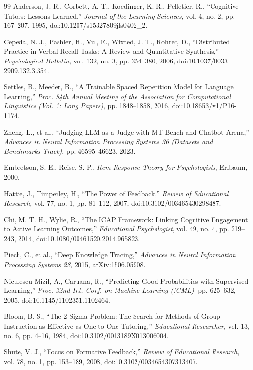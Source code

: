 \documentclass[12pt]{report}
\begin{document}
\begin{thebibliography}{99}
 Anderson, J. R., Corbett, A. T., Koedinger, K. R., Pelletier, R., ``Cognitive Tutors: Lessons Learned,'' \textit{Journal of the Learning Sciences}, vol. 4, no. 2, pp. 167--207, 1995, doi:10.1207/s15327809jls0402\_2.

 Cepeda, N. J., Pashler, H., Vul, E., Wixted, J. T., Rohrer, D., ``Distributed Practice in Verbal Recall Tasks: A Review and Quantitative Synthesis,'' \textit{Psychological Bulletin}, vol. 132, no. 3, pp. 354--380, 2006, doi:10.1037/0033-2909.132.3.354.

 Settles, B., Meeder, B., ``A Trainable Spaced Repetition Model for Language Learning,'' \textit{Proc. 54th Annual Meeting of the Association for Computational Linguistics (Vol. 1: Long Papers)}, pp. 1848--1858, 2016, doi:10.18653/v1/P16-1174.

 Zheng, L., et al., ``Judging LLM-as-a-Judge with MT-Bench and Chatbot Arena,'' \textit{Advances in Neural Information Processing Systems 36 (Datasets and Benchmarks Track)}, pp. 46595--46623, 2023.

 Embretson, S. E., Reise, S. P., \textit{Item Response Theory for Psychologists}, Erlbaum, 2000.

 Hattie, J., Timperley, H., ``The Power of Feedback,'' \textit{Review of Educational Research}, vol. 77, no. 1, pp. 81--112, 2007, doi:10.3102/003465430298487.

 Chi, M. T. H., Wylie, R., ``The ICAP Framework: Linking Cognitive Engagement to Active Learning Outcomes,'' \textit{Educational Psychologist}, vol. 49, no. 4, pp. 219--243, 2014, doi:10.1080/00461520.2014.965823.

 Piech, C., et al., ``Deep Knowledge Tracing,'' \textit{Advances in Neural Information Processing Systems 28}, 2015, arXiv:1506.05908.

 Niculescu-Mizil, A., Caruana, R., ``Predicting Good Probabilities with Supervised Learning,'' \textit{Proc. 22nd Int. Conf. on Machine Learning (ICML)}, pp. 625--632, 2005, doi:10.1145/1102351.1102464.

 Bloom, B. S., ``The 2 Sigma Problem: The Search for Methods of Group Instruction as Effective as One-to-One Tutoring,'' \textit{Educational Researcher}, vol. 13, no. 6, pp. 4--16, 1984, doi:10.3102/0013189X013006004.

 Shute, V. J., ``Focus on Formative Feedback,'' \textit{Review of Educational Research}, vol. 78, no. 1, pp. 153--189, 2008, doi:10.3102/0034654307313407.


\end{thebibliography}
\end{document}

